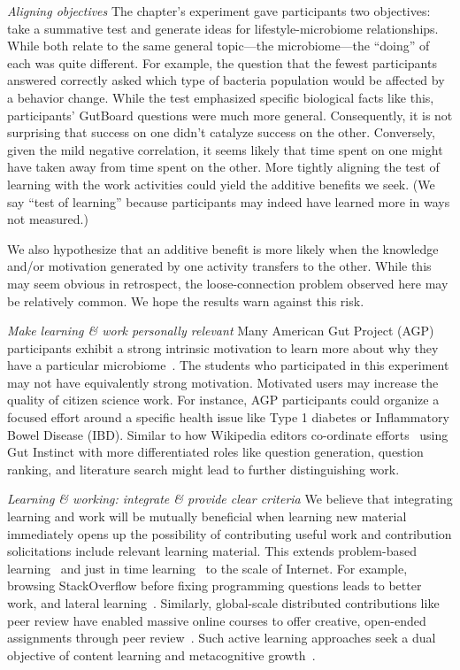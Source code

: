 \textit{Aligning objectives}
The chapter’s experiment gave participants two objectives: take a summative test and generate ideas for lifestyle-microbiome relationships. While both relate to the same general topic---the microbiome---the “doing” of each was quite different. For example, the question that the fewest participants answered correctly asked which type of bacteria population would be affected by a behavior change. While the test emphasized specific biological facts like this, participants’ GutBoard questions were much more general. Consequently, it is not surprising that success on one didn’t catalyze success on the other. Conversely, given the mild negative correlation, it seems likely that time spent on one might have taken away from time spent on the other. More tightly aligning the test of learning with the work activities could yield the additive benefits we seek. (We say “test of learning” because participants may indeed have learned more in ways not measured.) 

We also hypothesize that an additive benefit is more likely when the knowledge and/or motivation generated by one activity transfers to the other. While this may seem obvious in retrospect, the loose-connection problem observed here may be relatively common. We hope the results warn against this risk.

\textit{Make learning \& work personally relevant}
Many American Gut Project (AGP) participants exhibit a strong intrinsic motivation to learn more about why they have a particular microbiome~\cite{Debelius2016}. The students who participated in this experiment may not have equivalently strong motivation. Motivated users may increase the quality of citizen science work. For instance, AGP participants could organize a focused effort around a specific health issue like Type 1 diabetes or Inflammatory Bowel Disease (IBD). Similar to how Wikipedia editors co-ordinate efforts~\cite{Krieger2009} using Gut Instinct with more differentiated roles like question generation, question ranking, and literature search might lead to further distinguishing work.

\textit{Learning \& working: integrate \& provide clear criteria}
We believe that integrating learning and work will be mutually beneficial when learning new material immediately opens up the possibility of contributing useful work and contribution solicitations include relevant learning material. This extends problem-based learning~\cite{Savery1995} and just in time learning~\cite{Bolton1999} to the scale of Internet. For example, browsing StackOverflow before fixing programming questions leads to better work, and lateral learning~\cite{Mamykina2011}. Similarly, global-scale distributed contributions like peer review have enabled massive online courses to offer creative, open-ended assignments through peer review~\cite{Kulkarni2013peer}. Such active learning approaches seek a dual objective of content learning and metacognitive growth~\cite{Crouch2001}.
 
